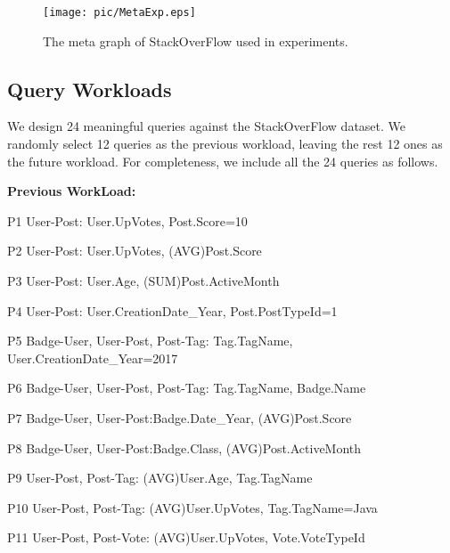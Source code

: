 \begin{figure}[H]
	\centering
	\texttt{[image: pic/MetaExp.eps]}
	\caption{The meta graph of StackOverFlow used in experiments.}
	\label{fig:5:1}
\end{figure}


\subsection{Query Workloads}
We design 24 meaningful queries against the StackOverFlow dataset. We randomly select 12 queries as the previous workload, leaving the rest 12 ones as the future workload. For completeness, we include all the 24 queries as follows. %


\textbf{Previous WorkLoad:}

P1 \hspace{3mm} User-Post: User.UpVotes, Post.Score=10

P2 \hspace{3mm} User-Post: User.UpVotes, (AVG)Post.Score

P3 \hspace{3mm} User-Post: User.Age, (SUM)Post.ActiveMonth

P4 \hspace{3mm} User-Post: User.CreationDate\_Year, Post.PostTypeId=1

P5 \hspace{3mm} Badge-User, User-Post, Post-Tag: Tag.TagName, User.CreationDate\_Year=2017

P6 \hspace{3mm} Badge-User, User-Post, Post-Tag: Tag.TagName, Badge.Name

P7 \hspace{3mm} Badge-User, User-Post:Badge.Date\_Year, (AVG)Post.Score

P8 \hspace{3mm} Badge-User, User-Post:Badge.Class, (AVG)Post.ActiveMonth

P9 \hspace{3mm} User-Post, Post-Tag: (AVG)User.Age, Tag.TagName

P10 \hspace{1.3mm} User-Post, Post-Tag: (AVG)User.UpVotes, Tag.TagName=Java

P11 \hspace{1.3mm} User-Post, Post-Vote: (AVG)User.UpVotes, Vote.VoteTypeId

